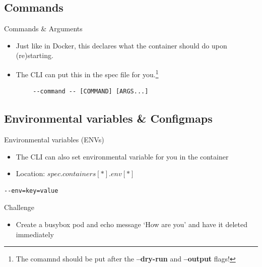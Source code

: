 \documentclass{beamer}
\begin{document}
\subsection{Commands}

\begin{frame}[fragile]{Commands \& Arguments}
    \begin{itemize}
        \item Just like in Docker, this declares what the container should do upon (re)starting.
        \item The CLI can put this in the spec file for you.\footnote{The comamnd should be put after the \textbf{--dry-run} and \textbf{--output} flags!}
    \end{itemize}
    
    \begin{lstlisting}
        --command -- [COMMAND] [ARGS...]
    \end{lstlisting}
    
\end{frame}

\subsection{Environmental variables \& Configmaps}

\begin{frame}[fragile]{Environmental variables (ENVs)}
    
    \begin{itemize}
    \item The CLI can also set environmental variable for you in the container
    \item Location: $spec.containers[*].env[*]$
\end{itemize}

\begin{lstlisting}
--env=key=value
\end{lstlisting}
    
\end{frame}

\begin{frame}{Challenge}
    
    \begin{itemize}
        \item Create a busybox pod and echo message ‘How are you’ and have it deleted immediately
    \end{itemize}
    
\end{frame}
\end{document}
